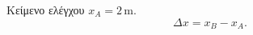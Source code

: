 \documentclass[11pt,twoside,openright]{book}
\begin{document}
\pagestyle{empty}
Κείμενο ελέγχου $x_A=2\,\mathrm{m}$.
\begin{equation}\Delta x=x_B-x_A.\end{equation}
\end{document}
